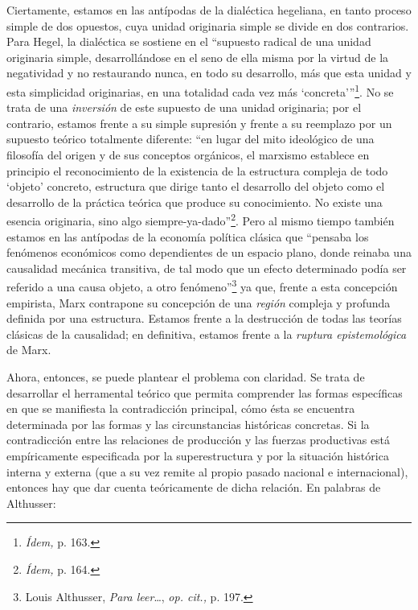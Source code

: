 Ciertamente, estamos en las antípodas de la dialéctica hegeliana, en tanto proceso simple de dos opuestos, cuya unidad originaria simple se divide en dos contrarios. Para Hegel, la dialéctica se sostiene en el \enquote{supuesto radical de una unidad originaria simple, desarrollándose en el seno de ella misma por la virtud de la negatividad y no restaurando nunca, en todo su desarrollo, más que esta unidad y esta simplicidad originarias, en una totalidad cada vez más \enquote{concreta}}\footnote{\emph{Ídem,} p. 163.}. No se trata de una \emph{inversión} de este supuesto de una unidad originaria; por el contrario, estamos frente a su simple supresión y frente a su reemplazo por un supuesto teórico totalmente diferente: \enquote{en lugar del mito ideológico de una filosofía del origen y de sus conceptos orgánicos, el marxismo establece en principio el reconocimiento de la existencia de la estructura compleja de todo \enquote{objeto} concreto, estructura que dirige tanto el desarrollo del objeto como el desarrollo de la práctica teórica que produce su conocimiento. No existe una esencia originaria, sino algo siempre-ya-dado}\footnote{\emph{Ídem,} p. 164.}. Pero al mismo tiempo también estamos en las antípodas de la economía política clásica que \enquote{pensaba los fenómenos económicos como dependientes de un espacio plano, donde reinaba una causalidad mecánica transitiva, de tal modo que un efecto determinado podía ser referido a una causa objeto, a otro fenómeno}\footnote{Louis Althusser, \emph{Para leer}\ldots, \emph{op. cit.,} p. 197.} ya que, frente a esta concepción empirista, Marx contrapone su concepción de una \emph{región} compleja y profunda definida por una estructura. Estamos frente a la destrucción de todas las teorías clásicas de la causalidad; en definitiva, estamos frente a la \emph{ruptura epistemológica} de Marx.

Ahora, entonces, se puede plantear el problema con claridad. Se trata de desarrollar el herramental teórico que permita comprender las formas específicas en que se manifiesta la contradicción principal, cómo ésta se encuentra determinada por las formas y las circunstancias históricas concretas. Si la contradicción entre las relaciones de producción y las fuerzas productivas está empíricamente especificada por la superestructura y por la situación histórica interna y externa (que a su vez remite al propio pasado nacional e internacional), entonces hay que dar cuenta teóricamente de dicha relación. En palabras de Althusser:

